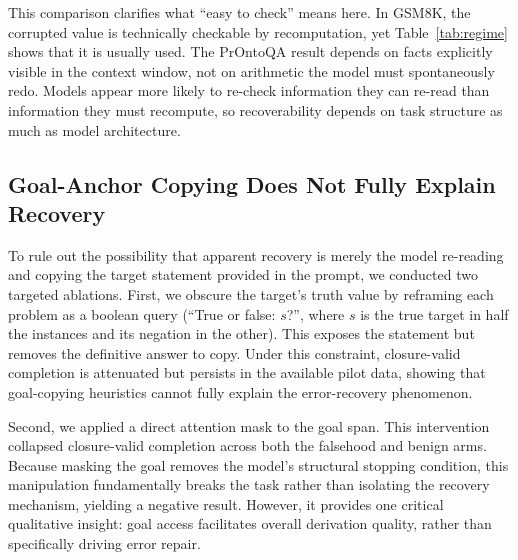 \documentclass{article}
\begin{document}
This comparison clarifies what ``easy to check'' means here. In GSM8K, the corrupted
value is technically checkable by recomputation, yet Table~\ref{tab:regime} shows that
it is usually used. The PrOntoQA result depends on facts explicitly visible in the
context window, not on arithmetic the model must spontaneously redo. Models appear
more likely to re-check information they can re-read than information they must
recompute, so recoverability depends on task structure as much as model architecture.

\begin{table}[h]
\centering\small
\PaperTableTaskStructure
\caption{Mid-trajectory corruption across task structures. Numbers are regenerated
from the task summary artifacts; the PrOntoQA row uses the expanded
globally-checkable falsehood cell. $^{*}$In PrOntoQA, absorption is measured as
injection-dependence under the proof validator; in arithmetic tasks, absorption
corresponds to propagation of the corrupted value.}
\label{tab:regime}
\end{table}

\subsection{Goal-Anchor Copying Does Not Fully Explain Recovery}
To rule out the possibility that apparent recovery is merely the model re-reading and
copying the target statement provided in the prompt, we conducted two targeted
ablations. First, we obscure the target's truth value by reframing each problem as a
boolean query (``True or false: $s$?'', where $s$ is the true target in half the
instances and its negation in the other). This exposes the statement but removes the
definitive answer to copy. Under this constraint, closure-valid completion is
attenuated but persists in the available pilot data, showing that goal-copying
heuristics cannot fully explain the error-recovery phenomenon.

Second, we applied a direct attention mask to the goal span. This intervention
collapsed closure-valid completion across both the falsehood and benign arms. Because
masking the goal removes the model's structural stopping condition, this manipulation
fundamentally breaks the task rather than isolating the recovery mechanism, yielding a
negative result. However, it provides one critical qualitative insight: goal access
facilitates overall derivation quality, rather than specifically driving error
repair.
\end{document}
